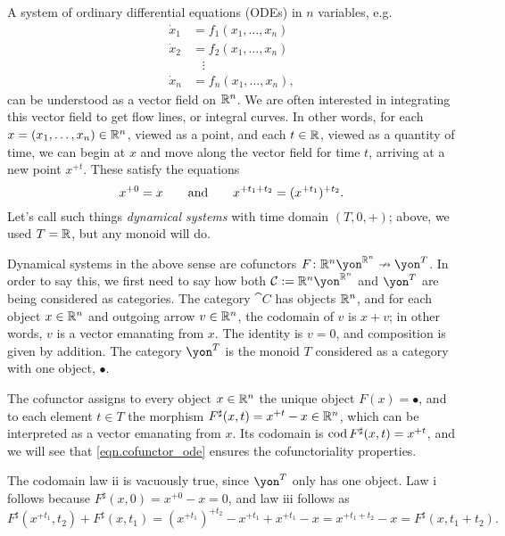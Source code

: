 \documentclass[Book-Poly]{subfiles}
\begin{document}
\begin{example}
A system of ordinary differential equations (ODEs) in $n$ variables, e.g.
\begin{align*}
    \dot{x}_1 &= f_1(x_1, \ldots, x_n) \\
    \dot{x}_2 &= f_2(x_1, \ldots, x_n) \\
    & \; \; \; \vdots \\
    \dot{x}_n &= f_n(x_1, \ldots, x_n),
\end{align*}
can be understood as a vector field on $\mathbb{R}^n$.
We are often interested in integrating this vector field to get flow lines, or integral curves.
In other words, for each $x=(x_1, \ldots, x_n)\in\mathbb{R}^n$, viewed as a point, and each $t\in\mathbb{R}$, viewed as a quantity of time, we can begin at $x$ and move along the vector field for time $t$, arriving at a new point $x^{+t}$. These satisfy the equations
\begin{equation} \label{eqn.cofunctor_ode}
    x^{+0} = x \qquad\text{and}\qquad x^{+t_1+t_2} = (x^{+t_1})^{+t_2}. 
\end{equation}
Let's call such things \emph{dynamical systems} with time domain $(T, 0, +)$; above, we used $T = \mathbb{R}$, but any monoid will do.

Dynamical systems in the above sense are cofunctors $F \colon \rr^n \yon^{\rr^n} \cof \yon^T$.
In order to say this, we first need to say how both $\cat{C} := \rr^n \yon^{\rr^n}$ and $\yon^T$ are being considered as categories.
The category $\cat{C}$ has objects $\mathbb{R}^n$, and for each object $x \in \mathbb{R}^n$ and outgoing arrow $v \in \mathbb{R}^n$, the codomain of $v$ is $x + v$; in other words, $v$ is a vector emanating from $x$.
The identity is $v = 0$, and composition is given by addition.
The category $\yon^T$ is the monoid $T$ considered as a category with one object, $\bullet$.

The cofunctor assigns to every object $x \in \mathbb{R}^n$ the unique object $F(x) = \bullet$, and to each element $t \in T$ the morphism $F^\sharp(x, t) = x^{+t} - x \in \mathbb{R}^n$, which can be interpreted as a vector emanating from $x$.
Its codomain is $\operatorname{cod} F^\sharp(x, t) = x^{+t}$, and we will see that \eqref{eqn.cofunctor_ode} ensures the cofunctoriality properties.

The codomain law ii is vacuously true, since $\yon^T$ only has one object.
Law i follows because $F^\sharp(x, 0) = x^{+0} - x = 0$, and law iii follows as
\[
    F^\sharp(x^{+t_1}, t_2) + F^\sharp(x, t_1) = (x^{+t_1})^{+t_2} - x^{+t_1} + x^{+t_1} - x = x^{+t_1 + t_2} - x = F^\sharp(x, t_1+t_2).
\]
\end{example}
\end{document}
